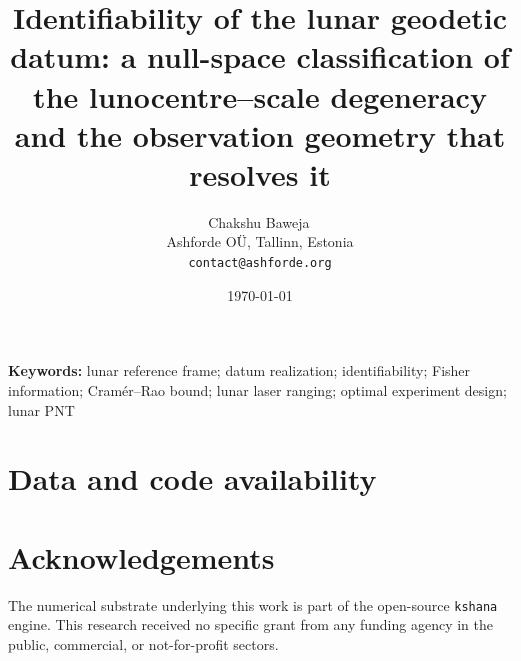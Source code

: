 \documentclass[11pt]{article}
\title{\textbf{Identifiability of the lunar geodetic datum: a null-space
classification of the lunocentre--scale degeneracy and the observation
geometry that resolves it}}
\author{Chakshu Baweja\,\orcidlink{0009-0008-2098-0751}\\
\small Ashforde O\"U, Tallinn, Estonia \\
\small \texttt{contact@ashforde.org}}
\date{\today}
\theoremstyle{definition}
\newcommand{\code}[1]{\texttt{#1}}
\begin{document}
\maketitle

\begin{abstract}

\end{abstract}

\noindent\textbf{Keywords:} lunar reference frame; datum realization;
identifiability; Fisher information; Cram\'er--Rao bound; lunar laser ranging;
optimal experiment design; lunar PNT

\vspace{0.5em}









\section*{Data and code availability}


\section*{Acknowledgements}
The numerical substrate underlying this work is part of the open-source
\code{kshana} engine. This research received no specific grant from any funding
agency in the public, commercial, or not-for-profit sectors.




\appendix

\end{document}
